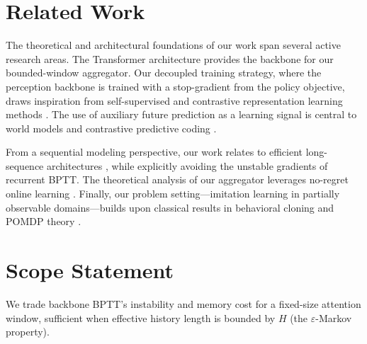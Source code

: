 \documentclass[11pt]{article}
\begin{document}
\section{Related Work}
The theoretical and architectural foundations of our work span several active research areas. The Transformer architecture \citep{vaswani2017attention} provides the backbone for our bounded-window aggregator. Our decoupled training strategy, where the perception backbone is trained with a stop-gradient from the policy objective, draws inspiration from self-supervised and contrastive representation learning methods \citep{grill2020byol, chen2021simsiam, stooke2021decoupling}. The use of auxiliary future prediction as a learning signal is central to world models \citep{ha2018worldmodels, hafner2019planet, hafner2020dreamer} and contrastive predictive coding \citep{oord2018cpc}. 

From a sequential modeling perspective, our work relates to efficient long-sequence architectures \citep{gu2022s4, gu2023mamba}, while explicitly avoiding the unstable gradients of recurrent BPTT. The theoretical analysis of our aggregator leverages no-regret online learning \citep{ross2011dagger, freund1997hedge}. Finally, our problem setting—imitation learning in partially observable domains—builds upon classical results in behavioral cloning \citep{pomerleau1991} and POMDP theory \citep{kaelbling1998}. 

\section{Scope Statement}
We trade backbone BPTT's instability and memory cost for a fixed-size attention window, sufficient when effective history length is bounded by \(H\) (the \(\varepsilon\)-Markov property).
\end{document}
